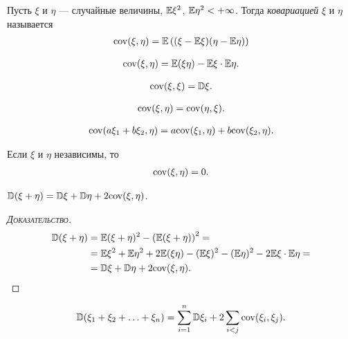 \begin{df}[ковариация]
 Пусть $ \xi $ и $ \eta $ --- случайные величины, $ \mathbb E\xi^{2} $, $ \mathbb E\eta^{2} < +\infty$. Тогда \textit{ковариацией} $ \xi $ и $ \eta $ называется
 \begin{align*}
  \mathrm{cov}(\xi,\eta) = \mathbb E \left( (\xi - \mathbb E\xi)(\eta - \mathbb E\eta) \right)
 \end{align*} 
\end{df}
\begin{prop}
 \begin{align*}
  \mathrm{cov}(\xi,\eta) = \mathbb E(\xi\eta) - \mathbb E\xi \cdot \mathbb E\eta.
 \end{align*} 
\end{prop}
\begin{prop}
 \begin{align*}
  \mathrm{cov}(\xi,\xi) = \mathbb D\xi.
 \end{align*} 
\end{prop}
\begin{prop}
 \begin{align*}
  \mathrm{cov}(\xi,\eta) = \mathrm{cov}(\eta,\xi).
 \end{align*}
\end{prop}
\begin{prop}
 \begin{align*}
  \mathrm{cov}(a\xi_1 + b\xi_2, \eta) = a\mathrm{cov}(\xi_1,\eta) + b \mathrm{cov}(\xi_2, \eta).
 \end{align*} 
\end{prop}
\begin{prop}
 Если $ \xi $ и $ \eta $ независимы, то
 \begin{align*}
  \mathrm{cov}(\xi,\eta) = 0.
 \end{align*} 
\end{prop}
\begin{prop}
 $ \mathbb D(\xi + \eta) = \mathbb D\xi + \mathbb D\eta + 2\mathrm{cov}(\xi,\eta) $.
\end{prop}
\begin{proof}[\normalfont\textsc{Доказательство}]
 \begin{align*}
  \mathbb D(\xi+\eta) &= \mathbb E(\xi+\eta)^{2} - \left( \mathbb E(\xi+\eta) \right)^{2} = \\
  &= \mathbb E\xi^{2} + \mathbb E\eta^{2} + 2\mathbb E(\xi\eta) - (\mathbb E\xi)^{2} - (\mathbb E\eta)^{2} - 2\mathbb E\xi \cdot \mathbb E\eta = \\
  &= \mathbb D\xi + \mathbb D\eta +2\mathrm{cov}(\xi,\eta).
 \end{align*} 
\end{proof}
\begin{prop}
 \begin{align*}
  \mathbb D(\xi_1 + \xi_2 + \ldots + \xi_n) = \sum_{i=1}^{n} \mathbb D\xi_i + 2 \sum_{i < j} \mathrm{cov}(\xi_i, \xi_j).
 \end{align*} 
\end{prop}

